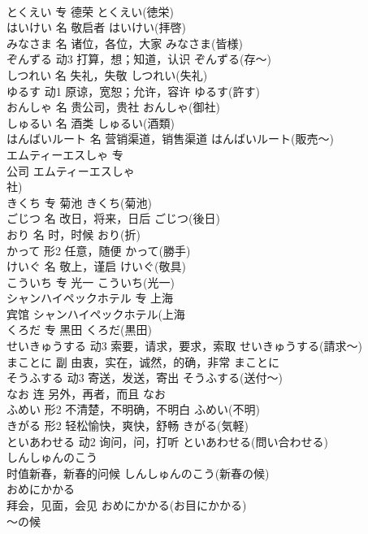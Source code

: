 \documentclass[8pt]{extreport}
\begin{document}
\begin{CJK}{UTF8}{min}
\\	とくえい	专	德荣	とくえい(徳栄)	
\\	はいけい	名	敬启者	はいけい(拝啓)	
\\	みなさま	名	诸位，各位，大家	みなさま(皆様)	
\\	ぞんずる	动3	打算，想；知道，认识	ぞんずる(存～)	
\\	しつれい	名	失礼，失敬	しつれい(失礼)	
\\	ゆるす	动1	原谅，宽恕；允许，容许	ゆるす(許す)	
\\	おんしゃ	名	贵公司，贵社	おんしゃ(御社)	
\\	しゅるい	名	酒类	しゅるい(酒類)	
\\	はんばいルート	名	营销渠道，销售渠道	はんばいルート(販売～)	
\\	エムティーエスしゃ	专	
\\	公司	エムティーエスしゃ
\\	社)	
\\	きくち	专	菊池	きくち(菊池)	
\\	ごじつ	名	改日，将来，日后	ごじつ(後日)	
\\	おり	名	时，时候	おり(折)	
\\	かって	形2	任意，随便	かって(勝手)	
\\	けいぐ	名	敬上，谨启	けいぐ(敬具)	
\\	こういち	专	光一	こういち(光一)	
\\	シャンハイペックホテル	专	上海
\\	宾馆	シャンハイペックホテル(上海
\\	くろだ	专	黑田	くろだ(黒田)	
\\	せいきゅうする	动3	索要，请求，要求，索取	せいきゅうする(請求～)	
\\	まことに	副	由衷，实在，诚然，的确，非常	まことに	
\\	そうふする	动3	寄送，发送，寄出	そうふする(送付～)	
\\	なお	连	另外，再者，而且	なお	
\\	ふめい	形2	不清楚，不明确，不明白	ふめい(不明)	
\\	きがる	形2	轻松愉快，爽快，舒畅	きがる(気軽)	
\\	といあわせる	动2	询问，问，打听	といあわせる(問い合わせる)	
\\	しんしゅんのこう	
\\	时值新春，新春的问候	しんしゅんのこう(新春の候)	
\\	おめにかかる	
\\	拜会，见面，会见	おめにかかる(お目にかかる)	
\\	～の候	

\end{CJK}
\end{document}
